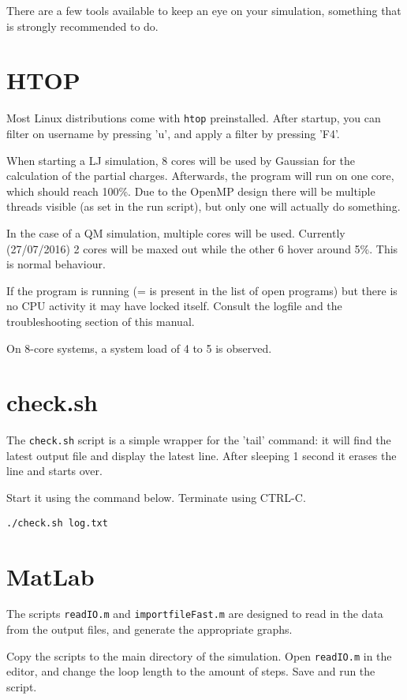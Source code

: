 There are a few tools available to keep an eye on your simulation, something 
that is strongly recommended to do.


\section{HTOP}
Most Linux distributions come with \verb|htop| preinstalled. After startup, you 
can filter on username by pressing 'u', and apply a filter by pressing 'F4'. 

When starting a LJ simulation, 8 cores will be used by Gaussian for the 
calculation of the partial charges. Afterwards, the program will run on one 
core, which should reach 100\%. Due to the OpenMP design there will be multiple 
threads visible (as set in the run script), but only one will actually do 
something.

In the case of a QM simulation, multiple cores will be used. Currently 
(27/07/2016) 2 cores will be maxed out while the other 6 hover around 5\%. This 
is normal behaviour.

If the program is running (= is present in the list of open programs) but there 
is no CPU activity it may have locked itself. Consult the logfile and the 
troubleshooting section of this manual.

On 8-core systems, a system load of 4 to 5 is observed.

\section{check.sh}
The \verb|check.sh| script is a simple wrapper for the 'tail' command: it will 
find the latest output file and display the latest line. After sleeping 1 
second it erases the line and starts over.

Start it using the command below. Terminate using CTRL-C.
\begin{lstlisting}[caption=The check utility]
./check.sh log.txt
\end{lstlisting}

\section{MatLab}
The scripts \verb|readIO.m| and \verb|importfileFast.m| are designed to read in 
the data from the output files, and generate the appropriate graphs.

Copy the scripts to the main directory of the simulation. Open \verb|readIO.m| 
in the editor, and change the loop length to the amount of steps. Save and run 
the script.

